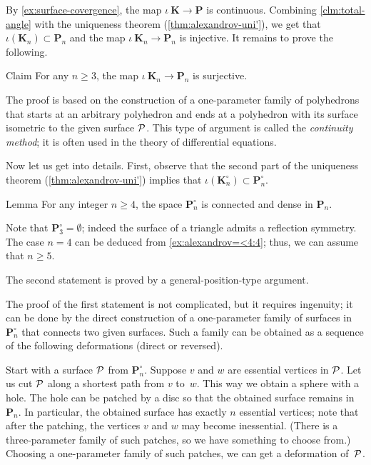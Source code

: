 By \ref{ex:surface-covergence}, the map $\iota\:\bm{K}\to\bm{P}$ is continuous.
Combining \ref{clm:total-angle} with the uniqueness theorem (\ref{thm:alexandrov-uni'}), we get that $\iota(\bm{K}_n)\subset \bm{P}_n$ and the map $\iota\:\bm{K}_n\to\bm{P}_n$ is injective.
It remains to prove the following.

\begin{thm}{Claim}\label{clm:surjective}
For any $n\ge 3$, the map $\iota\:\bm{K}_n\to\bm{P}_n$ is surjective.
\end{thm}

The proof is based on the construction of a one-parameter family of polyhedrons that starts at an arbitrary polyhedron
and ends at a polyhedron with its surface isometric to the given surface $\mathcal{P}$.
This type of argument is called the \emph{continuity method}; it is often used in the theory of differential equations.

\medskip

Now let us get into details.
First, observe that the second part of the uniqueness theorem (\ref{thm:alexandrov-uni'}) implies that $\iota(\bm{K}_n^\circ)\subset \bm{P}_n^\circ$.

\begin{thm}{Lemma}\label{lem:connected}
For any integer $n\ge 4$, the space $\bm{P}_n^\circ$ is connected and dense in $\bm{P}_n$.
\end{thm}

Note that $\bm{P}_3^\circ=\emptyset$;
indeed the surface of a triangle admits a reflection symmetry.
The case $n=4$ can be deduced from \ref{ex:alexandrov=<4:4}; thus, we can assume that $n\ge 5$.

The second statement is proved by a general-position-type argument.

The proof of the first statement is not complicated, but it requires ingenuity;
it can be done by the direct construction of a one-parameter family of surfaces in $\bm{P}_n^\circ$ that connects two given surfaces.
Such a family can be obtained as a sequence of the following deformations (direct or reversed).

Start with a surface $\mathcal{P}$ from $\bm{P}_n^\circ$.
Suppose $v$ and $w$ are essential vertices in $\mathcal{P}$.
Let us cut $\mathcal{P}$ along a shortest path from $v$ to~$w$.
This way we obtain a sphere with a hole.
The hole can be patched by a disc so that the obtained surface remains in $\bm{P}_n$.
In particular, the obtained surface has exactly $n$ essential vertices;
note that after the patching, the vertices $v$ and $w$ may become inessential.
(There is a three-parameter family of such patches, so we have something to choose from.)
Choosing a one-parameter family of such patches, we can get a deformation of~$\mathcal{P}$.

